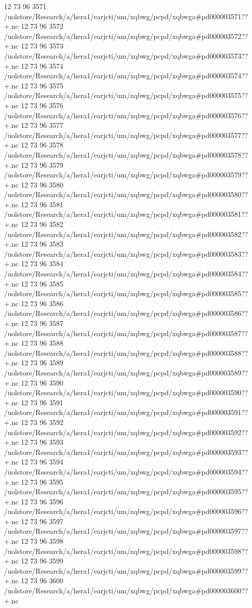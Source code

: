 12 73 96
3571
/uolstore/Research/a/hera1/earjcti/um/xqbwg/pcpd/xqbwga#pd000003571??+.nc
12 73 96
3572
/uolstore/Research/a/hera1/earjcti/um/xqbwg/pcpd/xqbwga#pd000003572??+.nc
12 73 96
3573
/uolstore/Research/a/hera1/earjcti/um/xqbwg/pcpd/xqbwga#pd000003573??+.nc
12 73 96
3574
/uolstore/Research/a/hera1/earjcti/um/xqbwg/pcpd/xqbwga#pd000003574??+.nc
12 73 96
3575
/uolstore/Research/a/hera1/earjcti/um/xqbwg/pcpd/xqbwga#pd000003575??+.nc
12 73 96
3576
/uolstore/Research/a/hera1/earjcti/um/xqbwg/pcpd/xqbwga#pd000003576??+.nc
12 73 96
3577
/uolstore/Research/a/hera1/earjcti/um/xqbwg/pcpd/xqbwga#pd000003577??+.nc
12 73 96
3578
/uolstore/Research/a/hera1/earjcti/um/xqbwg/pcpd/xqbwga#pd000003578??+.nc
12 73 96
3579
/uolstore/Research/a/hera1/earjcti/um/xqbwg/pcpd/xqbwga#pd000003579??+.nc
12 73 96
3580
/uolstore/Research/a/hera1/earjcti/um/xqbwg/pcpd/xqbwga#pd000003580??+.nc
12 73 96
3581
/uolstore/Research/a/hera1/earjcti/um/xqbwg/pcpd/xqbwga#pd000003581??+.nc
12 73 96
3582
/uolstore/Research/a/hera1/earjcti/um/xqbwg/pcpd/xqbwga#pd000003582??+.nc
12 73 96
3583
/uolstore/Research/a/hera1/earjcti/um/xqbwg/pcpd/xqbwga#pd000003583??+.nc
12 73 96
3584
/uolstore/Research/a/hera1/earjcti/um/xqbwg/pcpd/xqbwga#pd000003584??+.nc
12 73 96
3585
/uolstore/Research/a/hera1/earjcti/um/xqbwg/pcpd/xqbwga#pd000003585??+.nc
12 73 96
3586
/uolstore/Research/a/hera1/earjcti/um/xqbwg/pcpd/xqbwga#pd000003586??+.nc
12 73 96
3587
/uolstore/Research/a/hera1/earjcti/um/xqbwg/pcpd/xqbwga#pd000003587??+.nc
12 73 96
3588
/uolstore/Research/a/hera1/earjcti/um/xqbwg/pcpd/xqbwga#pd000003588??+.nc
12 73 96
3589
/uolstore/Research/a/hera1/earjcti/um/xqbwg/pcpd/xqbwga#pd000003589??+.nc
12 73 96
3590
/uolstore/Research/a/hera1/earjcti/um/xqbwg/pcpd/xqbwga#pd000003590??+.nc
12 73 96
3591
/uolstore/Research/a/hera1/earjcti/um/xqbwg/pcpd/xqbwga#pd000003591??+.nc
12 73 96
3592
/uolstore/Research/a/hera1/earjcti/um/xqbwg/pcpd/xqbwga#pd000003592??+.nc
12 73 96
3593
/uolstore/Research/a/hera1/earjcti/um/xqbwg/pcpd/xqbwga#pd000003593??+.nc
12 73 96
3594
/uolstore/Research/a/hera1/earjcti/um/xqbwg/pcpd/xqbwga#pd000003594??+.nc
12 73 96
3595
/uolstore/Research/a/hera1/earjcti/um/xqbwg/pcpd/xqbwga#pd000003595??+.nc
12 73 96
3596
/uolstore/Research/a/hera1/earjcti/um/xqbwg/pcpd/xqbwga#pd000003596??+.nc
12 73 96
3597
/uolstore/Research/a/hera1/earjcti/um/xqbwg/pcpd/xqbwga#pd000003597??+.nc
12 73 96
3598
/uolstore/Research/a/hera1/earjcti/um/xqbwg/pcpd/xqbwga#pd000003598??+.nc
12 73 96
3599
/uolstore/Research/a/hera1/earjcti/um/xqbwg/pcpd/xqbwga#pd000003599??+.nc
12 73 96
3600
/uolstore/Research/a/hera1/earjcti/um/xqbwg/pcpd/xqbwga#pd000003600??+.nc

